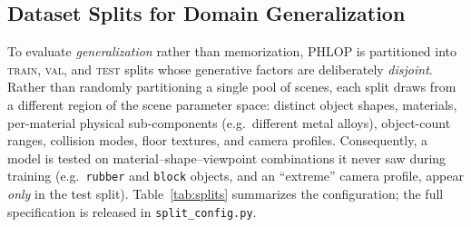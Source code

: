 


\subsection{Dataset Splits for Domain Generalization}

To evaluate \emph{generalization} rather than memorization, PHLOP is partitioned
into \textsc{train}, \textsc{val}, and \textsc{test} splits whose generative
factors are deliberately \emph{disjoint}. Rather than randomly partitioning a
single pool of scenes, each split draws from a different region of the scene
parameter space: distinct object shapes, materials, per-material physical
sub-components (e.g.\ different metal alloys), object-count ranges, collision
modes, floor textures, and camera profiles. Consequently, a model is tested on
material--shape--viewpoint combinations it never saw during training
(e.g.\ \texttt{rubber} and \texttt{block} objects, and an ``extreme'' camera
profile, appear \emph{only} in the test split). Table~\ref{tab:splits}
summarizes the configuration; the full specification is released in
\texttt{split\_config.py}.

